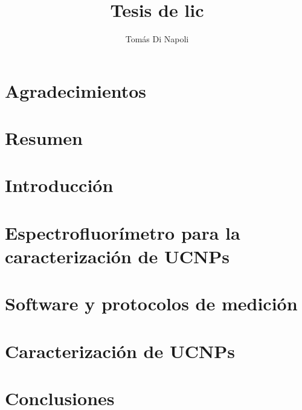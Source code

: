 \documentclass[12pt]{report}
\title{Tesis de lic}
\author{Tomás Di Napoli}
\begin{document}
\maketitle


\chapter*{Agradecimientos}

\chapter*{Resumen}

\tableofcontents


\chapter{Introducción}


\chapter{Espectrofluorímetro para la caracterización de UCNPs}


\chapter{Software y protocolos de medición}


\chapter{Caracterización de UCNPs}


\chapter{Conclusiones}






\begin{appendices}

\end{appendices}
\end{document}
